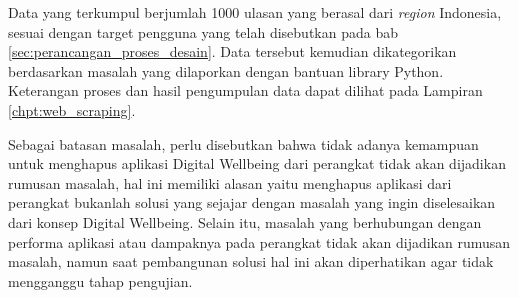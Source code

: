 Data yang terkumpul berjumlah 1000 ulasan yang berasal dari \textit{region} Indonesia, sesuai dengan target pengguna yang telah disebutkan pada bab \ref{sec:perancangan_proses_desain}. Data tersebut kemudian dikategorikan berdasarkan masalah yang dilaporkan 
dengan bantuan library Python. Keterangan proses dan hasil pengumpulan data dapat dilihat pada Lampiran \ref{chpt:web_scraping}. 


Sebagai batasan masalah, perlu disebutkan bahwa tidak adanya kemampuan untuk menghapus aplikasi Digital Wellbeing dari perangkat tidak akan dijadikan rumusan masalah, hal ini memiliki alasan yaitu menghapus aplikasi dari perangkat bukanlah solusi yang sejajar dengan masalah yang ingin diselesaikan dari konsep Digital Wellbeing. Selain itu, masalah yang berhubungan dengan performa aplikasi atau dampaknya pada perangkat tidak akan dijadikan rumusan masalah, namun saat pembangunan solusi hal ini akan diperhatikan agar tidak mengganggu tahap pengujian.



